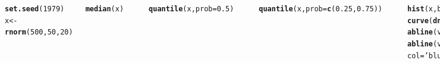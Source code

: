 \documentclass{beamer}\usepackage[]{graphicx}\usepackage[]{color}
\makeatletter
\newcommand{\hlnum}[1]{\textcolor[rgb]{0.686,0.059,0.569}{#1}}%
\newcommand{\hlstr}[1]{\textcolor[rgb]{0.192,0.494,0.8}{#1}}%
\newcommand{\hlcom}[1]{\textcolor[rgb]{0.678,0.584,0.686}{\textit{#1}}}%
\newcommand{\hlstd}[1]{\textcolor[rgb]{0.345,0.345,0.345}{#1}}%
\newcommand{\hlkwb}[1]{\textcolor[rgb]{0.69,0.353,0.396}{#1}}%
\newcommand{\hlkwc}[1]{\textcolor[rgb]{0.333,0.667,0.333}{#1}}%
\newcommand{\hlkwd}[1]{\textcolor[rgb]{0.737,0.353,0.396}{\textbf{#1}}}%
\newenvironment{kframe}{%
 \def\at@end@of@kframe{}%
 \ifinner\ifhmode%
  \def\at@end@of@kframe{\end{minipage}}%
  \begin{minipage}{\columnwidth}%
 \fi\fi%
 \def\FrameCommand##1{\hskip\@totalleftmargin \hskip-\fboxsep
 \colorbox{shadecolor}{##1}\hskip-\fboxsep
     \hskip-\linewidth \hskip-\@totalleftmargin \hskip\columnwidth}%
 \MakeFramed {\advance\hsize-\width
   \@totalleftmargin\z@ \linewidth\hsize
   \@setminipage}}%
 {\par\unskip\endMakeFramed%
 \at@end@of@kframe}
\newenvironment{knitrout}{}{} %
\renewenvironment{knitrout}{\setlength{\topsep}{0mm}}{}
\makeatother
\begin{document}
\begin{frame}[fragile]%

\begin{columns}[c]


\begin{knitrout}\tiny
{}\color{fgcolor}\begin{kframe}
\begin{alltt}
\hlkwd{set.seed}\hlstd{(}\hlnum{1979}\hlstd{)}
\hlstd{x} \hlkwb{<-} \hlkwd{rnorm}\hlstd{(}\hlnum{500}\hlstd{,}\hlnum{50}\hlstd{,}\hlnum{20}\hlstd{)}

\hlkwd{median}\hlstd{(x)}
\end{alltt}
\begin{verbatim}
## [1] 51.39951
\end{verbatim}
\begin{alltt}
\hlkwd{quantile}\hlstd{(x,}\hlkwc{prob}\hlstd{=}\hlnum{0.5}\hlstd{)}
\end{alltt}
\begin{verbatim}
##      50% 
## 51.39951
\end{verbatim}
\begin{alltt}
\hlkwd{quantile}\hlstd{(x,}\hlkwc{prob}\hlstd{=}\hlkwd{c}\hlstd{(}\hlnum{0.25}\hlstd{,}\hlnum{0.75}\hlstd{))}
\end{alltt}
\begin{verbatim}
##      25%      75% 
## 37.76660 64.73483
\end{verbatim}
\begin{alltt}
\hlkwd{hist}\hlstd{(x,}\hlkwc{breaks}\hlstd{=}\hlnum{40}\hlstd{,}\hlkwc{prob}\hlstd{=T,}\hlkwc{xlim}\hlstd{=}\hlkwd{c}\hlstd{(}\hlnum{0}\hlstd{,}\hlnum{100}\hlstd{),}\hlkwc{col}\hlstd{=}\hlstr{'gray70'}\hlstd{)}
\hlkwd{curve}\hlstd{(}\hlkwd{dnorm}\hlstd{(x,}\hlkwc{mean}\hlstd{=}\hlnum{50}\hlstd{,} \hlkwc{sd}\hlstd{=}\hlnum{20}\hlstd{),} \hlkwc{add}\hlstd{=T)}
\hlkwd{abline}\hlstd{(}\hlkwc{v}\hlstd{=}\hlkwd{median}\hlstd{(x),}\hlkwc{col}\hlstd{=}\hlstr{'red'}\hlstd{,}\hlkwc{lwd}\hlstd{=}\hlnum{2}\hlstd{,}\hlkwc{lty}\hlstd{=}\hlnum{2}\hlstd{)}
\hlkwd{abline}\hlstd{(}\hlkwc{v}\hlstd{=}\hlkwd{quantile}\hlstd{(x,}\hlkwc{prob}\hlstd{=}\hlkwd{c}\hlstd{(}\hlnum{0.25}\hlstd{,}\hlnum{0.75}\hlstd{)),}\hlcom{#}
       \hlkwc{col}\hlstd{=}\hlstr{'blue'}\hlstd{,}\hlkwc{lwd}\hlstd{=}\hlnum{2}\hlstd{,}\hlkwc{lty}\hlstd{=}\hlnum{2}\hlstd{)}
\end{alltt}
\end{kframe}
\end{knitrout}


\end{columns}
\end{frame}
\end{document}
